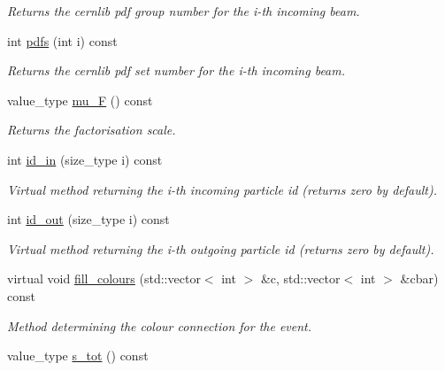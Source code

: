 \begin{DoxyCompactItemize}
\begin{DoxyCompactList}\small\item\em Returns the cernlib pdf group number for the i-\/th incoming beam. \end{DoxyCompactList}\item 
\hypertarget{a00454_a471032c2b3043fa0775580408dd7b468}{}int \hyperlink{a00454_a471032c2b3043fa0775580408dd7b468}{pdfs} (int i) const \label{a00454_a471032c2b3043fa0775580408dd7b468}

\begin{DoxyCompactList}\small\item\em Returns the cernlib pdf set number for the i-\/th incoming beam. \end{DoxyCompactList}\item 
\hypertarget{a00454_ab6d6385b83be901d28b7bdc5a5bed8bd}{}value\+\_\+type \hyperlink{a00454_ab6d6385b83be901d28b7bdc5a5bed8bd}{mu\+\_\+\+F} () const \label{a00454_ab6d6385b83be901d28b7bdc5a5bed8bd}

\begin{DoxyCompactList}\small\item\em Returns the factorisation scale. \end{DoxyCompactList}\item 
int \hyperlink{a00454_a7421839159915e361c59a30548cb4185}{id\+\_\+in} (size\+\_\+type i) const 
\begin{DoxyCompactList}\small\item\em Virtual method returning the i-\/th incoming particle id (returns zero by default). \end{DoxyCompactList}\item 
int \hyperlink{a00454_aaa5d50f406703e527ddd2db2655b0641}{id\+\_\+out} (size\+\_\+type i) const 
\begin{DoxyCompactList}\small\item\em Virtual method returning the i-\/th outgoing particle id (returns zero by default). \end{DoxyCompactList}\item 
\hypertarget{a00454_abebffbb041d82b15b6f73ba807d0d894}{}virtual void \hyperlink{a00454_abebffbb041d82b15b6f73ba807d0d894}{fill\+\_\+colours} (std\+::vector$<$ int $>$ \&c, std\+::vector$<$ int $>$ \&cbar) const \label{a00454_abebffbb041d82b15b6f73ba807d0d894}

\begin{DoxyCompactList}\small\item\em Method determining the colour connection for the event. \end{DoxyCompactList}\item 
\hypertarget{a00454_ac3dcfe284b1069885658f83e77cadec5}{}value\+\_\+type \hyperlink{a00454_ac3dcfe284b1069885658f83e77cadec5}{s\+\_\+tot} () const \label{a00454_ac3dcfe284b1069885658f83e77cadec5}


\end{DoxyCompactItemize}
